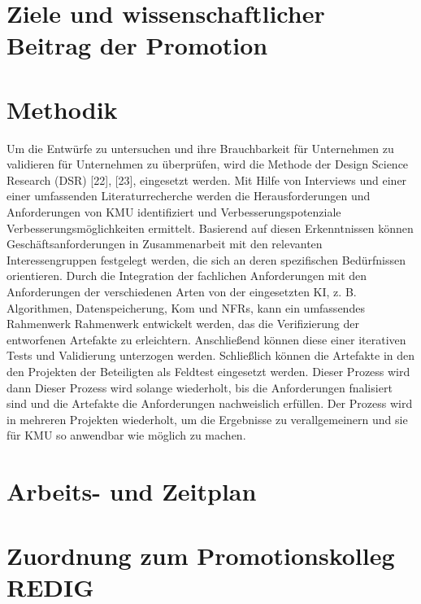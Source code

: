 \documentclass[11pt,a4paper,pointlessnumbers]{scrartcl}
\theoremstyle{break}
\numberwithin{equation}{section}
\begin{document}
\section{Ziele und wissenschaftlicher Beitrag der Promotion}


\section{Methodik}
Um die Entwürfe zu untersuchen und ihre Brauchbarkeit für Unternehmen zu validieren
für Unternehmen zu überprüfen, wird die Methode der Design Science Research (DSR)
[22], [23], eingesetzt werden. Mit Hilfe von Interviews und einer
einer umfassenden Literaturrecherche werden die Herausforderungen und
Anforderungen von KMU identifiziert und Verbesserungspotenziale
Verbesserungsmöglichkeiten ermittelt.
Basierend auf diesen Erkenntnissen können Geschäftsanforderungen
in Zusammenarbeit mit den relevanten Interessengruppen festgelegt werden,
die sich an deren spezifischen Bedürfnissen orientieren. Durch die Integration der fachlichen
Anforderungen mit den Anforderungen der verschiedenen Arten von
der eingesetzten KI, z. B. Algorithmen, Datenspeicherung, Kom
und NFRs, kann ein umfassendes Rahmenwerk
Rahmenwerk entwickelt werden, das die Verifizierung der entworfenen
Artefakte zu erleichtern. Anschließend können diese einer iterativen
Tests und Validierung unterzogen werden. Schließlich können die Artefakte in den
den Projekten der Beteiligten als Feldtest eingesetzt werden. Dieser Prozess wird dann
Dieser Prozess wird solange wiederholt, bis die Anforderungen fnalisiert sind und die
Artefakte die Anforderungen nachweislich erfüllen. Der Prozess wird
in mehreren Projekten wiederholt, um die Ergebnisse zu verallgemeinern und
sie für KMU so anwendbar wie möglich zu machen.


\section{Arbeits- und Zeitplan}

\section{Zuordnung zum Promotionskolleg REDIG}



\end{document}
